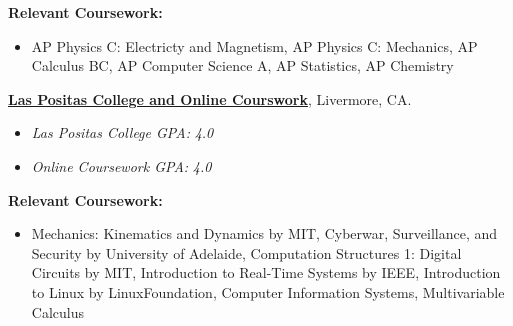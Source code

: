 \documentclass[10pt]{article}
\newenvironment{outerlist}[1][\enskip\textbullet]%
        {\begin{itemize}[#1,leftmargin=*]}{\end{itemize}%
         \vspace{-.6\baselineskip}}
\begin{document}
\textbf{Relevant Coursework:}
\begin{outerlist}
\item[]  AP Physics C: Electricty and Magnetism, AP Physics C: Mechanics, AP Calculus BC, AP Computer Science A, AP Statistics, AP Chemistry
\end{outerlist}
\href{http://www.laspositascollege.edu/}{\textbf{Las Positas College and Online Courswork}}, Livermore, CA. 
\begin{outerlist}
\item[] \emph{Las Positas College GPA:} \emph{4.0}
\item[] \emph{Online Coursework GPA:} \emph{4.0}
\end{outerlist}
\vspace{.05in}
\textbf{Relevant Coursework:}
\begin{outerlist}
\item[] Mechanics: Kinematics and Dynamics by MIT, Cyberwar, Surveillance, and Security by University of Adelaide, Computation Structures 1: Digital Circuits by MIT,  Introduction to Real-Time Systems by IEEE, Introduction to Linux by LinuxFoundation, Computer Information Systems, Multivariable Calculus

\end{outerlist}
\vspace{-.075in}
\end{document}
